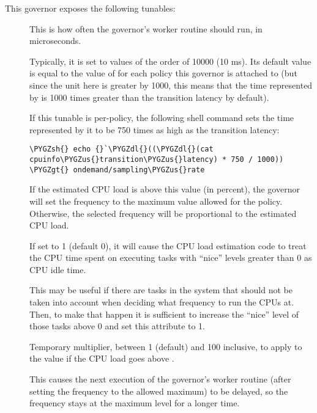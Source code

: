 \documentclass[a4paper,8pt,english]{sphinxmanual}
\def\PYGZus{\char`\_}
\def\PYGZgt{\char`\>}
\def\PYGZsh{\char`\#}
\def\PYGZdl{\char`\$}
\begin{document}
This governor exposes the following tunables:
\begin{description}
\item[{}] \leavevmode
This is how often the governor's worker routine should run, in
microseconds.

Typically, it is set to values of the order of 10000 (10 ms).  Its
default value is equal to the value of 
for each policy this governor is attached to (but since the unit here
is greater by 1000, this means that the time represented by
 is 1000 times greater than the transition latency by
default).

If this tunable is per-policy, the following shell command sets the time
represented by it to be 750 times as high as the transition latency:

\begin{Verbatim}[commandchars=\\\{\}]
\PYGZsh{} echo {}`\PYGZdl{}((\PYGZdl{}(cat cpuinfo\PYGZus{}transition\PYGZus{}latency) * 750 / 1000)) \PYGZgt{} ondemand/sampling\PYGZus{}rate
\end{Verbatim}

\item[{}] \leavevmode
If the estimated CPU load is above this value (in percent), the governor
will set the frequency to the maximum value allowed for the policy.
Otherwise, the selected frequency will be proportional to the estimated
CPU load.

\item[{}] \leavevmode
If set to 1 (default 0), it will cause the CPU load estimation code to
treat the CPU time spent on executing tasks with ``nice'' levels greater
than 0 as CPU idle time.

This may be useful if there are tasks in the system that should not be
taken into account when deciding what frequency to run the CPUs at.
Then, to make that happen it is sufficient to increase the ``nice'' level
of those tasks above 0 and set this attribute to 1.

\item[{}] \leavevmode
Temporary multiplier, between 1 (default) and 100 inclusive, to apply to
the  value if the CPU load goes above .

This causes the next execution of the governor's worker routine (after
setting the frequency to the allowed maximum) to be delayed, so the
frequency stays at the maximum level for a longer time.


\end{description}
\end{document}
